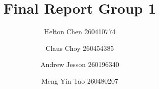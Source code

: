 \documentclass[conference]{IEEEtran}
\begin{document}
%
\title{Final Report Group 1}



\author{Helton Chen 260410774  \and Claus Choy 260454385 \and Andrew Jesson 260196340 \and Meng Yin Tao 260480207}


% 
\end{document}
